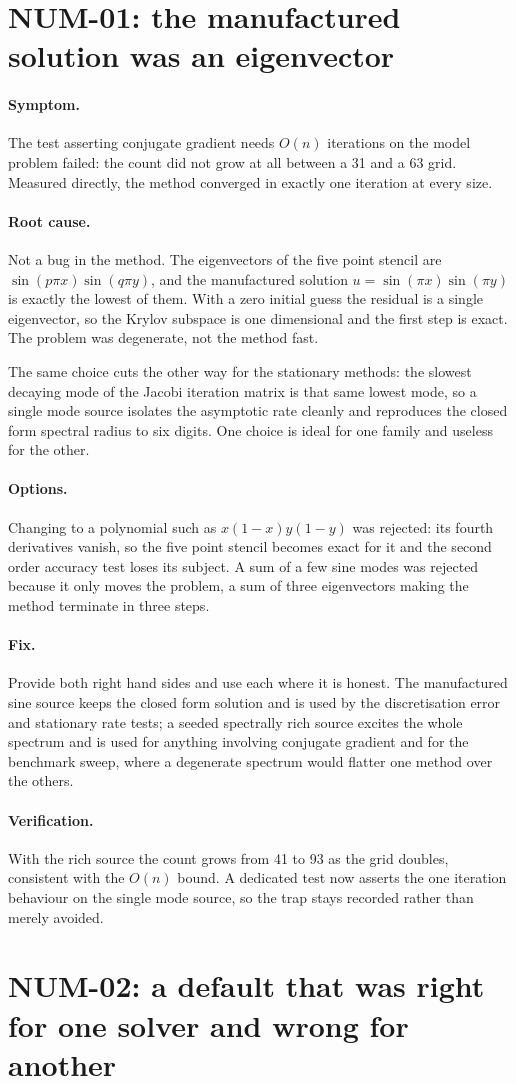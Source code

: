 \documentclass[11pt,a4paper]{report}
\newcommand{\symptom}[1]{\paragraph{Symptom.}#1}
\newcommand{\rootcause}[1]{\paragraph{Root cause.}#1}
\newcommand{\options}[1]{\paragraph{Options.}#1}
\newcommand{\fix}[1]{\paragraph{Fix.}#1}
\newcommand{\verification}[1]{\paragraph{Verification.}#1}
\begin{document}
\section{NUM-01: the manufactured solution was an eigenvector}

\symptom{The test asserting conjugate gradient needs $O(n)$ iterations on the
model problem failed: the count did not grow at all between a 31 and a 63 grid.
Measured directly, the method converged in exactly one iteration at every size.}

\rootcause{Not a bug in the method. The eigenvectors of the five point stencil
are $\sin(p\pi x)\sin(q\pi y)$, and the manufactured solution
$u = \sin(\pi x)\sin(\pi y)$ is exactly the lowest of them. With a zero initial
guess the residual is a single eigenvector, so the Krylov subspace is one
dimensional and the first step is exact. The problem was degenerate, not the
method fast.

The same choice cuts the other way for the stationary methods: the slowest
decaying mode of the Jacobi iteration matrix is that same lowest mode, so a
single mode source isolates the asymptotic rate cleanly and reproduces the closed
form spectral radius to six digits. One choice is ideal for one family and
useless for the other.}

\options{Changing to a polynomial such as $x(1-x)y(1-y)$ was rejected: its fourth
derivatives vanish, so the five point stencil becomes exact for it and the second
order accuracy test loses its subject. A sum of a few sine modes was rejected
because it only moves the problem, a sum of three eigenvectors making the method
terminate in three steps.}

\fix{Provide both right hand sides and use each where it is honest. The
manufactured sine source keeps the closed form solution and is used by the
discretisation error and stationary rate tests; a seeded spectrally rich source
excites the whole spectrum and is used for anything involving conjugate gradient
and for the benchmark sweep, where a degenerate spectrum would flatter one
method over the others.}

\verification{With the rich source the count grows from 41 to 93 as the grid
doubles, consistent with the $O(n)$ bound. A dedicated test now asserts the one
iteration behaviour on the single mode source, so the trap stays recorded rather
than merely avoided.}

\section{NUM-02: a default that was right for one solver and wrong for another}
\end{document}

